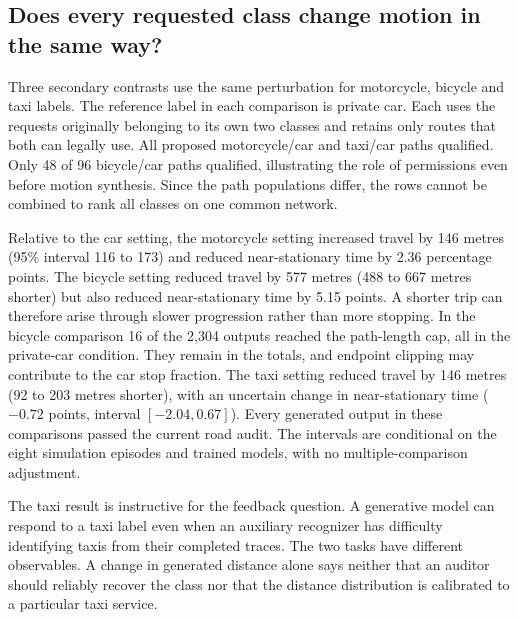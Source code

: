 \subsection{Does every requested class change motion in the same way?}
Three secondary contrasts use the same perturbation for motorcycle, bicycle and taxi labels. The reference label in each comparison is private car. Each uses the requests originally belonging to its own two classes and retains only routes that both can legally use. All proposed motorcycle/car and taxi/car paths qualified. Only 48 of 96 bicycle/car paths qualified, illustrating the role of permissions even before motion synthesis. Since the path populations differ, the rows cannot be combined to rank all classes on one common network.

Relative to the car setting, the motorcycle setting increased travel by 146 metres (95\% interval 116 to 173) and reduced near-stationary time by 2.36 percentage points. The bicycle setting reduced travel by 577 metres (488 to 667 metres shorter) but also reduced near-stationary time by 5.15 points. A shorter trip can therefore arise through slower progression rather than more stopping. In the bicycle comparison 16 of the 2,304 outputs reached the path-length cap, all in the private-car condition. They remain in the totals, and endpoint clipping may contribute to the car stop fraction. The taxi setting reduced travel by 146 metres (92 to 203 metres shorter), with an uncertain change in near-stationary time ($-0.72$ points, interval $[-2.04,0.67]$). Every generated output in these comparisons passed the current road audit. The intervals are conditional on the eight simulation episodes and trained models, with no multiple-comparison adjustment.

The taxi result is instructive for the feedback question. A generative model can respond to a taxi label even when an auxiliary recognizer has difficulty identifying taxis from their completed traces. The two tasks have different observables. A change in generated distance alone says neither that an auditor should reliably recover the class nor that the distance distribution is calibrated to a particular taxi service.
